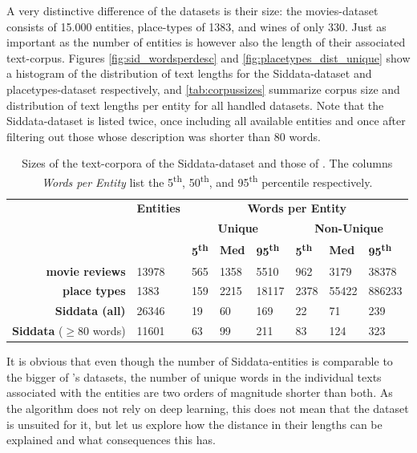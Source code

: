 A very distinctive difference of the datasets is their size: the movies-dataset consists of 15.000 entities, place-types of 1383, and wines of only 330. Just as important as the number of entities is however also the length of their associated text-corpus. Figures \ref{fig:sid_wordsperdesc} and \ref{fig:placetypes_dist_unique} show a histogram of the distribution of text lengths for the Siddata-dataset and placetypes-dataset respectively, and \autoref{tab:corpussizes} summarize corpus size and distribution of text lengths per entity for all handled datasets. Note that the Siddata-dataset is listed twice, once including all available entities and once after filtering out those whose description was shorter than 80 words.

\begin{table}[H]
	\centering
	\begin{tabular}{r|l|lll|lll}
		&  \textbf{Entities}   & \multicolumn{6}{c}{\textbf{Words per Entity}}                                 \\
		&       & \multicolumn{3}{c}{\textbf{Unique}} & \multicolumn{3}{c}{\textbf{Non-Unique}} \\
	 &  & \textbf{5\textsuperscript{th}} & \textbf{Med} & \textbf{95\textsuperscript{th}} & \textbf{5\textsuperscript{th}} & \textbf{Med} & \textbf{95\textsuperscript{th}} \\ \midrule
	\textbf{movie reviews}                                                          & 13978 & 565       & 1358       & 5510       & 962        & 3179        & 38378        \\
	\textbf{place types}                                                          & 1383  & 159       & 2215       & 18117      & 2378       & 55422       & 886233       \\
	\textbf{Siddata (all)}     & 26346 & 19        & 60         & 169        & 22         & 71          & 239          \\
	\textbf{Siddata} ($\geq 80$ words) & 11601 & 63        & 99         & 211        & 83         & 124         & 323         
	\end{tabular}
	\caption{Sizes of the text-corpora of the Siddata-dataset and those of \cite{Derrac2015}. The columns \textit{Words per Entity} list the 5\textsuperscript{th}, 50\textsuperscript{th}, and 95\textsuperscript{th} percentile respectively.}
	\label{tab:corpussizes}
\end{table}

It is obvious that even though the number of Siddata-entities is comparable to the bigger of \cite{Derrac2015}'s datasets, the number of unique words in the individual texts associated with the entities are two orders of magnitude shorter than both. As the algorithm does not rely on deep learning, this does not mean that the dataset is unsuited for it, but let us explore how the distance in their lengths can be explained and what consequences this has.

